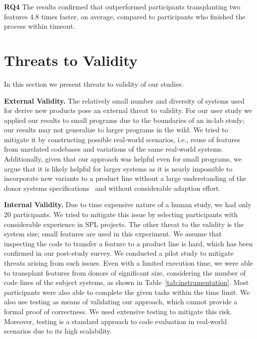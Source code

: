 \begin{framed}
\noindent \textbf{RQ4} The results confirmed that \prodscalpel outperformed participants transplanting two features 4.8 times faster, on average, compared to participants who finished the process within timeout.
\end{framed}

\section{Threats to Validity}

In this section we present threats to validity of our studies.

\textbf{External Validity.} The relatively small number and diversity of systems used for derive new products pose an external threat to validity. For our user study we applied our results to small programs due to the boundaries of an in-lab study; our results may not generalize to larger programs in the wild. We tried to mitigate it by constructing possible real-world scenarios, i.e., reuse of features from unrelated codebases and variations of the same real-world systems. Additionally, given that our approach was helpful even for small programs, we argue that it is likely helpful for larger systems as it is nearly impossible to incorporate new variants to a product line without a large understanding of the donor systems specifications~\cite{Assuncao2017} and without considerable adaption effort.

\textbf{Internal Validity.} Due to time expensive nature of a human study, we had only 20 participants. We tried to mitigate this issue by selecting participants with considerable experience in SPL projects. The other threat to the validity is the system size; small features are used in this experiment. We assume that inspecting the code to transfer a feature to a product line is hard, which has been confirmed in our post-study survey. We conducted a pilot study to mitigate threats arising from such issues.
Even with a limited execution time, we were able to transplant features from donors of significant size, considering the number of code lines of the subject systems, as shown in Table~\ref{tab:instrumentation}. 
Most participants were also able to complete the given tasks within the time limit.
We also use testing as means of validating our approach, which cannot provide a formal proof of correctness.  We used extensive testing to mitigate this risk. Moreover, testing is a standard approach to code evaluation in real-world scenarios due to its high scalability.
